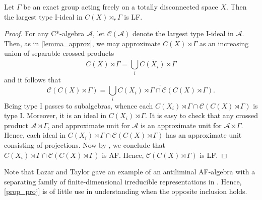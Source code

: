 \documentclass[12pt, a4paper, oneside]{amsart}
\newcommand{\0}{\mathbf{0}}
\newcommand{\1}{\mathbf{1}}
\newcommand{\A}{\mathscr{A}}
\newcommand{\sC}{\mathscr{C}}
\begin{document}
	\begin{proposition}
		\label{prop_inclusion}
		Let \(\Gamma\) be an exact group acting freely on a totally disconnected space \(X\). Then the largest type I-ideal in \(C(X) \rtimes_r \Gamma\) is LF. 
	\end{proposition}
	
	\begin{proof}
		For any C*-algebra \(\A\), let \(\sC(\A)\) denote the largest type I-ideal in \(\A\). Then, as in \cref{lemma_approx}, we may approximate $C(X) \rtimes \Gamma$ as an increasing union of separable crossed products \[C(X) \rtimes \Gamma = \overline{ \bigcup_i C(X_i) \rtimes \Gamma}\] and it follows that \[\sC(C(X) \rtimes \Gamma) = \overline{ \bigcup_i C(X_i) \rtimes \Gamma \cap \sC(C(X) \rtimes \Gamma)}.\] Being type I passes to subalgebras, whence each \(C(X_i) \rtimes \Gamma \cap \sC(C(X) \rtimes \Gamma)\) is type I. Moreover, it is an ideal in \(C(X_i) \rtimes \Gamma\). It is easy to check that any crossed product \(\A \rtimes \Gamma\), and approximate unit for \(\A\) is an approximate unit for \(\A \rtimes \Gamma\). Hence, each ideal in \(C(X_i) \rtimes \Gamma \cap \sC(C(X) \rtimes \Gamma)\) has an approximate unit consisting of projections. Now by \cite[Proposition 7.14]{pasnicu_phillips}, we conclude that \(C(X_i) \rtimes \Gamma \cap \sC(C(X) \rtimes \Gamma)\) is AF. Hence, \(\sC(C(X) \rtimes \Gamma)\) is LF. 
	\end{proof}
	
	\begin{remark}
		Note that Lazar and Taylor gave an example of an antiliminal AF-algebra with a separating family of finite-dimensional irreducible representations in \cite[Example 4.4]{lazar}. Hence, \cref{prop_proj} is of little use in understanding when the opposite inclusion holds. 
	\end{remark}
	
\end{document}
